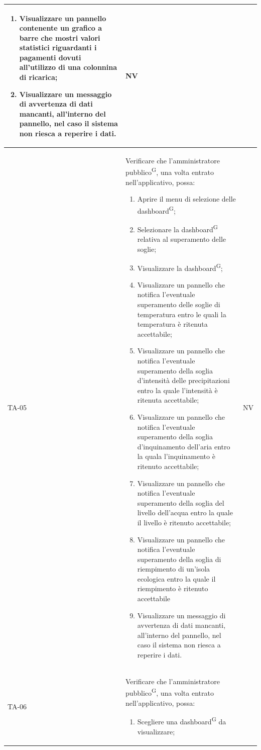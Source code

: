 \documentclass[8pt]{article}
\newcommand{\glossterm}[1]{#1\textsuperscript{G}} %
\begin{document}
\begin{longtable}{|>{\centering}p{2cm}|>{\RaggedRight}m{12cm}|>{\centering\arraybackslash}p{2cm}|}
\begin{enumerate}
        \item Visualizzare un pannello contenente un grafico a barre che mostri valori statistici riguardanti i pagamenti dovuti all'utilizzo di una colonnina di ricarica;
        \item Visualizzare un messaggio di avvertenza di dati mancanti, all’interno del pannello, nel caso il sistema non riesca a reperire i dati.
    \end{enumerate}
    & NV \\
    \hline
    TA-05 & Verificare che l’\glossterm{amministratore pubblico}, una volta entrato nell'applicativo, possa:
    \begin{enumerate}
        \setlength\itemsep{0em}
        \item Aprire il menu di selezione delle \glossterm{dashboard};
        \item Selezionare la \glossterm{dashboard} relativa al superamento delle soglie;
        \item Visualizzare la \glossterm{dashboard};
        \item Visualizzare un pannello che notifica l'eventuale superamento delle soglie di temperatura entro le quali la temperatura è ritenuta accettabile;
        \item Visualizzare un pannello che notifica l'eventuale superamento della soglia d'intensità delle precipitazioni entro la quale l'intensità è ritenuta accettabile;
        \item Visualizzare un pannello che notifica l'eventuale superamento della soglia d'inquinamento dell'aria entro la quala l'inquinamento è ritenuto accettabile;
        \item Visualizzare un pannello che notifica l'eventuale superamento della soglia del livello dell'acqua entro la quale il livello è ritenuto accettabile;
        \item Visualizzare un pannello che notifica l'eventuale superamento della soglia di riempimento di un'isola ecologica entro la quale il riempimento è ritenuto accettabile
        \item Visualizzare un messaggio di avvertenza di dati mancanti, all’interno del pannello, nel caso il sistema non riesca a reperire i dati.
    \end{enumerate}
    & NV \\
    \hline
    TA-06 & Verificare che l’\glossterm{amministratore pubblico}, una volta entrato nell’applicativo, possa:
    \begin{enumerate}
        \item Scegliere una \glossterm{dashboard} da visualizzare;

\end{enumerate}
\end{longtable}
\end{document}
